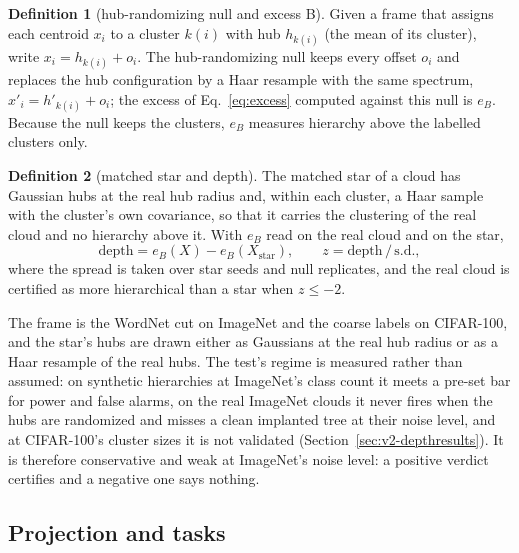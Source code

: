 \documentclass{article}
\theoremstyle{definition}
\newtheorem{definition}{Definition}
\begin{document}
\begin{shaded}
\begin{definition}[hub-randomizing null and excess B]
\label{def:hubnull}
Given a frame that assigns each centroid $x_i$ to a cluster $k(i)$ with hub $h_{k(i)}$ (the mean of its cluster), write $x_i=h_{k(i)}+o_i$. The hub-randomizing null keeps every offset $o_i$ and replaces the hub configuration by a Haar resample with the same spectrum, $x'_i=h'_{k(i)}+o_i$; the excess of Eq.~\ref{eq:excess} computed against this null is $e_B$. Because the null keeps the clusters, $e_B$ measures hierarchy above the labelled clusters only.
\end{definition}
\end{shaded}
\begin{shaded}
\begin{definition}[matched star and depth]
\label{def:star}
The matched star of a cloud has Gaussian hubs at the real hub radius and, within each cluster, a Haar sample with the cluster's own covariance, so that it carries the clustering of the real cloud and no hierarchy above it. With $e_B$ read on the real cloud and on the star,
\begin{equation}
\mathrm{depth}=e_B(X)-e_B(X_{\mathrm{star}}),\qquad z=\mathrm{depth}\,/\,\mathrm{s.d.},
\label{eq:depth}
\end{equation}
where the spread is taken over star seeds and null replicates, and the real cloud is certified as more hierarchical than a star when $z\le-2$.
\end{definition}
\end{shaded}
The frame is the WordNet cut on ImageNet and the coarse labels on CIFAR-100, and the star's hubs are drawn either as Gaussians at the real hub radius or as a Haar resample of the real hubs. The test's regime is measured rather than assumed: on synthetic hierarchies at ImageNet's class count it meets a pre-set bar for power and false alarms, on the real ImageNet clouds it never fires when the hubs are randomized and misses a clean implanted tree at their noise level, and at CIFAR-100's cluster sizes it is not validated (Section~\ref{sec:v2-depthresults}). It is therefore conservative and weak at ImageNet's noise level: a positive verdict certifies and a negative one says nothing.

\subsection{Projection and tasks}
\label{sec:v2-projection}
\end{document}

